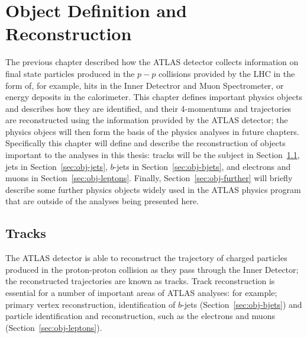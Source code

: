 \chapter{Object Definition and Reconstruction}
\label{sec:obj}

The previous chapter described how the ATLAS detector collects information on 
final state particles produced in the $p-p$ collisions provided by the LHC in the form of,
for example, hits in the Inner Detectror and Muon Spectrometer,
or energy deposits in the calorimeter.
This chapter defines important physics objects
and describes how they are identified, and their 4-momentums and trajectories are reconstructed using the information provided by the ATLAS detector;
the physics objecs will then form the basis of the physics analyses in future chapters.
Specifically this chapter will define and describe the reconstruction of objects important to the analyses in this thesis:
tracks will be the subject in Section~\ref{sec:obj-tracks}, jets in Section~\ref{sec:obj-jets},
$b$-jets in Section~\ref{sec:obj-bjets}, and electrons and muons in Section~\ref{sec:obj-leptons}.
Finally, Section~\ref{sec:obj-further} will briefly describe some further physics objects
widely used in the ATLAS physics program that are outside of the analyses being presented here.

\section{Tracks}
\label{sec:obj-tracks}

The ATLAS detector is able to reconstruct the trajectory of charged particles produced
in the proton-proton collision as they pass through the Inner Detector;
the reconstructed trajectories are known as tracks.
Track reconstruction is essential for a number of important areas of ATLAS analyses:
for example; primary vertex reconstruction, identification of $b$-jets (Section~\ref{sec:obj-bjets})
and particle identification and reconstruction, such as the electrons and muons (Section~\ref{sec:obj-leptons}).

